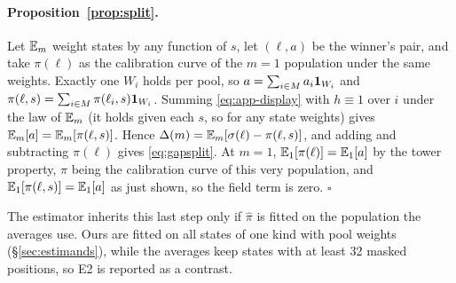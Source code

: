 \paragraph{Proposition~\ref{prop:split}.}
Let $\mathbb{E}_m$ weight states by any function of $s$, let $(\ell,a)$ be the winner's pair, and take
$\pi(\ell)$ as the calibration curve of the $m=1$ population under the same weights. Exactly one
$W_i$ holds per pool, so $a=\sum_{i\in M}a_i\mathbf{1}_{W_i}$ and
$\pi(\ell,s)=\sum_{i\in M}\pi(\ell_i,s)\mathbf{1}_{W_i}$. Summing \eqref{eq:app-display} with
$h\equiv1$ over $i$ under the law of $\mathbb{E}_m$ (it holds given each $s$, so for any state
weights) gives $\mathbb{E}_m[a]=\mathbb{E}_m[\pi(\ell,s)]$. Hence
$\Delta(m)=\mathbb{E}_m[\sigma(\ell)-\pi(\ell,s)]$, and adding and subtracting $\pi(\ell)$ gives
\eqref{eq:gapsplit}. At $m=1$, $\mathbb{E}_1[\pi(\ell)]=\mathbb{E}_1[a]$ by the tower property, $\pi$ being the
calibration curve of this very population, and $\mathbb{E}_1[\pi(\ell,s)]=\mathbb{E}_1[a]$ as just shown, so
the field term is zero. \hfill$\square$

The estimator inherits this last step only if $\hat\pi$ is fitted on the population the averages
use. Ours are fitted on all states of one kind with pool weights (\S\ref{sec:estimands}), while the
averages keep states with at least 32 masked positions, so E2 is reported as a contrast.
